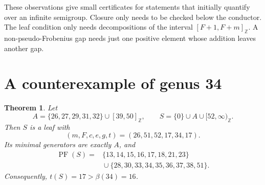 \documentclass[11pt,letterpaper]{article}
\numberwithin{equation}{section}
\newtheorem{theorem}{Theorem}[section]
\theoremstyle{definition}
\theoremstyle{remark}
\newcommand{\Z}{\mathbb Z}
\newcommand{\ints}[2]{[#1,#2]_{\Z}}
\newcommand{\tail}[1]{[#1,\infty)_{\Z}}
\DeclareMathOperator{\PF}{PF}
\newcommand{\conjb}{\beta}
\begin{document}
These observations give small certificates for statements that initially
quantify over an infinite semigroup. Closure only needs to be checked below
the conductor. The leaf condition only needs decompositions of the interval
$\ints{F+1}{F+m}$. A non-pseudo-Frobenius gap needs just one positive element
whose addition leaves another gap.

\section{A counterexample of genus 34}\label{sec:small}

\begin{theorem}\label{thm:small}
Let
\begin{equation}\label{eq:smallS}
 A=\{26,27,29,31,32\}\cup\ints{39}{50},\qquad
 S=\{0\}\cup A\cup\tail{52}.
\end{equation}
Then $S$ is a leaf with
\[
 (m,F,c,e,g,t)=(26,51,52,17,34,17).
\]
Its minimal generators are exactly $A$, and
\begin{align}\label{eq:smallPF}
 \PF(S)={}&\{13,14,15,16,17,18,21,23\}\nonumber\\
 &{}\cup\{28,30,33,34,35,36,37,38,51\}.
\end{align}
Consequently, $t(S)=17>\conjb(34)=16$.
\end{theorem}
\end{document}
